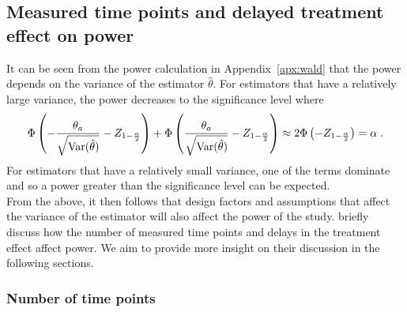 \documentclass[10pt]{article}
\begin{document}
\subsection{Measured time points and delayed treatment effect on power} \label{apx:power}

It can be seen from the power calculation in Appendix~\ref{apx:wald} that the power depends on the variance of the estimator $\hat{\theta}$. For estimators that have a relatively large variance, the power decreases to the significance level where
\[
\Phi\left(-\frac{\theta_a}{\sqrt{\mathrm{Var}(\hat{\theta})}}-Z_{1-\frac{\alpha}{2}}\right) + \Phi\left(\frac{\theta_a}{\sqrt{\mathrm{Var}(\hat{\theta})}} - Z_{1-\frac{\alpha}{2}}\right) \approx 2\Phi\left(-Z_{1-\frac{\alpha}{2}}\right) = \alpha \;.
\]
For estimators that have a relatively small variance, one of the terms dominate and so a power greater than the significance level can be expected.
\\

From the above, it then follows that design factors and assumptions that affect the variance of the estimator will also affect the power of the study. \textcite{Hussey:2007} briefly discuss how the number of measured time points and delays in the treatment effect affect power. We aim to provide more insight on their discussion in the following sections.

\subsubsection{Number of time points}
\end{document}
